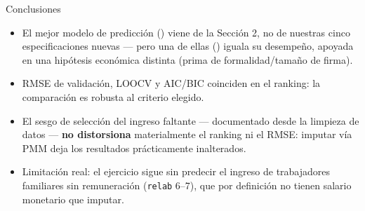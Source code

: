 \documentclass[aspectratio=169]{beamer}
\begin{document}
\begin{frame}{Conclusiones}
  \begin{itemize}
    \item El mejor modelo de predicción (\PredBestModel) viene de la
      Sección 2, no de nuestras cinco especificaciones nuevas --- pero una de
      ellas (\PredSecondModel) iguala su desempeño, apoyada en una hipótesis
      económica distinta (prima de formalidad/tamaño de firma).
    \item RMSE de validación, LOOCV y AIC/BIC coinciden en el ranking: la
      comparación es robusta al criterio elegido.
    \item El sesgo de selección del ingreso faltante --- documentado desde la
      limpieza de datos --- \textbf{no distorsiona} materialmente el ranking
      ni el RMSE: imputar vía PMM deja los resultados prácticamente
      inalterados.
    \item Limitación real: el ejercicio sigue sin predecir el ingreso de
      trabajadores familiares sin remuneración (\texttt{relab} 6--7), que por
      definición no tienen salario monetario que imputar.
  \end{itemize}
\end{frame}
\end{document}
